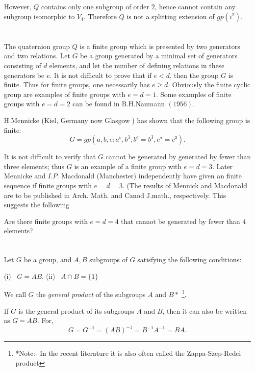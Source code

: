 However, $Q$ contains only one subgroup of order $2$, hence cannot
contain any subgroup isomorphic to $V_4$. Therefore $Q$ is not a
splitting extension of $gp(i^2)$. 

\section{} %

The quaternion group $Q$ is a finite group which is presented by two
generators and two relations.  Let $G$ be a group generated by a
minimal set of generators consisting of $d$ elements, and let  the
number of defining relations in these generators be $e$. It is not
difficult to prove that if $e < d$, then the group $G$ is finite. Thus
for finite groups, one necessarily has $e \ge d$. Obviously the finite
cyclic group are examples of finite  groups with $e = d=1$. Some
examples of finite groups with $e = d =2$ can be found in B.H.Naumann
$(1956)$. 

H.Mennicke (Kiel, Germany now Glasgow ) has shown that the following
group is finite: 
$$
G= gp \left(a, b, c: a^b, b^3, b^c=b^3, c^a= c^3\right).
$$ 

It is not difficult to verify  that $G$ cannot be generated by
generated by fewer than three elements; thus $G$ is an example of a
finite group with $e= d=3$. Later Mennicke and $I. P$. Macdonald
(Manchester) independently have given an finite sequence if finite
groups  with $e= d =3$. (The results of Mennick and Macdonald are to
be published in Arch. Math. and Canod J.math., respectively. This
suggests the following 

\begin{unsolved problem}
  Are there finite groups with $e = d =4$ that cannot be generated by
  fewer than $4$ elements? 
\end{unsolved problem} 

\section{}%

Let $G$ be a group, and $A, B$ subgroups of $G$ satisfying the
following conditions: 

(i)~ $G= AB$,  \qquad (ii)~ $A \cap B = \{ 1\}$


We call $G$ the \textit{general product} of the subgroups  $A$ and
$B*$ \footnote{*Note:- In the recent literature it is also often
  called the Zappa-Szep-Redei product}. 

If $G$ is the general product of its subgroups $A$ and $B$, then it
can also be written as $G=AB$. For, 
$$
G=G^{-1} = (AB)^{-1} = B^{-1}A^{-1} = BA.
$$

